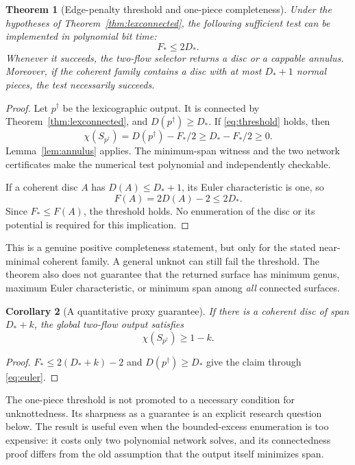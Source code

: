 \documentclass[11pt,letterpaper]{article}
\newtheorem{theorem}{Theorem}[section]
\newtheorem{corollary}[theorem]{Corollary}
\theoremstyle{definition}
\newcommand{\Fmin}{F_*}
\begin{document}
\begin{theorem}[Edge-penalty threshold and one-piece completeness]\label{thm:threshold}
Under the hypotheses of Theorem~\ref{thm:lexconnected}, the following sufficient test can be implemented in polynomial bit time:
\begin{equation}\label{eq:threshold}
 \Fmin\leq2D_*.
\end{equation}
Whenever it succeeds, the two-flow selector returns a disc or a cappable annulus. Moreover, if the coherent family contains a disc with at most $D_*+1$ normal pieces, the test necessarily succeeds.
\end{theorem}
\begin{proof}
Let $p^\dagger$ be the lexicographic output. It is connected by Theorem~\ref{thm:lexconnected}, and $D(p^\dagger)\geq D_*$. If \eqref{eq:threshold} holds, then
\[
 \chi(S_{p^\dagger})=D(p^\dagger)-\Fmin/2\geq D_*-\Fmin/2\geq0.
\]
Lemma~\ref{lem:annulus} applies. The minimum-span witness and the two network certificates make the numerical test polynomial and independently checkable.

If a coherent disc $A$ has $D(A)\leq D_*+1$, its Euler characteristic is one, so
\[
 F(A)=2D(A)-2\leq2D_*.
\]
Since $\Fmin\leq F(A)$, the threshold holds. No enumeration of the disc or its potential is required for this implication.
\end{proof}

This is a genuine positive completeness statement, but only for the stated near-minimal coherent family. A general unknot can still fail the threshold. The theorem also does not guarantee that the returned surface has minimum genus, maximum Euler characteristic, or minimum span among \emph{all} connected surfaces.

\begin{corollary}[A quantitative proxy guarantee]\label{cor:proxy}
If there is a coherent disc of span $D_*+k$, the global two-flow output satisfies
\[
 \chi(S_{p^\dagger})\geq1-k.
\]
\end{corollary}
\begin{proof}
$\Fmin\leq2(D_*+k)-2$ and $D(p^\dagger)\geq D_*$ give the claim through \eqref{eq:euler}.
\end{proof}

The one-piece threshold is not promoted to a necessary condition for unknottedness. Its sharpness as a guarantee is an explicit research question below. The result is useful even when the bounded-excess enumeration is too expensive: it costs only two polynomial network solves, and its connectedness proof differs from the old assumption that the output itself minimizes span.
\end{document}
